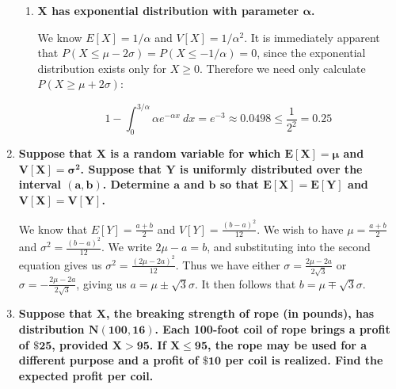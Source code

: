 \documentclass[10pt, oneside]{article}   	%
\theoremstyle{definition}
\begin{document}
\begin{enumerate}[label=9.\arabic*]
\begin{enumerate}
	\item  \begin{tcolorbox}[
	  colback=Cerulean!5!white,
	  colframe=Cerulean!75!black]
	\textbf{$\bm{X}$ has exponential distribution with parameter $\bm{\alpha}$.}
	\end{tcolorbox}
	
	We know $E[X] = 1/ \alpha$ and $V[X] = 1 / \alpha^2$. It is immediately apparent that $P(X \leq \mu - 2\sigma) = P(X \leq -1/\alpha) = 0$, since the exponential distribution exists only for $X \geq 0$. Therefore we need only calculate $P(X \geq \mu + 2\sigma)$:
	
	\[ 1 - \int^{3/\alpha}_0 \alpha e^{-\alpha x} \ dx = \boxed{e^{-3}} \approx 0.0498 \leq \frac{1}{2^2} = 0.25 \]
	
	\end{enumerate}

\item  \begin{tcolorbox}[
  colback=Cerulean!5!white,
  colframe=Cerulean!75!black]
\textbf{Suppose that $\bm{X}$ is a random variable for which $\bm{E[X] = \mu}$ and $\bm{V[X] = \sigma^2}$. Suppose that $\bm{Y}$ is uniformly distributed over the interval $\bm{(a,b)}$. Determine $\bm{a}$ and $\bm{b}$ so that $\bm{E[X] = E[Y]}$ and $\bm{V[X] = V[Y]}$.}
\end{tcolorbox}

We know that $E[Y] = \frac{a+b}{2}$ and $V[Y] = \frac{(b-a)^2}{12}$. We wish to have $\mu = \frac{a+b}{2}$ and $\sigma^2 = \frac{(b-a)^2}{12}$. We write $2\mu - a = b$, and substituting into the second equation gives us $\sigma^2 = \frac{(2\mu - 2a)^2}{12}$. Thus we have either $\sigma = \frac{2\mu - 2a}{2 \sqrt{3}}$ or $\sigma = -\frac{2\mu - 2a}{2 \sqrt{3}}$, giving us $\boxed{a = \mu \pm \sqrt{3} \sigma}$. It then follows that $\boxed{b = \mu \mp \sqrt{3} \sigma}$.

\newpage
\item  \begin{tcolorbox}[
  colback=Cerulean!5!white,
  colframe=Cerulean!75!black]
\textbf{Suppose that $\bm{X}$, the breaking strength of rope (in pounds), has distribution $\bm{N(100,16)}$. Each 100-foot coil of rope brings a profit of $\bm{\$ 25}$, provided $\bm{X > 95}$. If $\bm{X \leq 95}$, the rope may be used for a different purpose and a profit of $\bm{\$ 10}$ per coil is realized. Find the expected profit per coil.}
\end{tcolorbox}


\end{enumerate}
\end{document}
